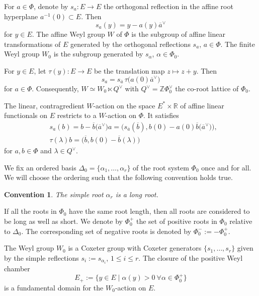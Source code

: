 \documentclass[pdftex]{sigma}
\numberwithin{equation}{section}
\newtheorem{Convention}[Theorem]{Convention}
\begin{document}
For $a\in\Phi$, denote by $s_a\colon E\rightarrow E$ the orthogonal reflection in the affine root hyperplane $a^{-1}(0)\subset E$. Then
\begin{equation*}%
s_a(y)=y-a(y)\overline{a}^\vee
\end{equation*}
for $y\in E$.
The affine Weyl group $W$ of $\Phi$ is the subgroup of affine linear transformations of $E$ generated by the orthogonal reflections $s_a$, $a\in\Phi$. The finite Weyl group $W_0$ is the subgroup generated by $s_\alpha$, $\alpha\in\Phi_0$.

For $y\in E$, let $\tau(y)\colon E\rightarrow E$ be the translation map $z\mapsto z+y$. Then
\begin{equation}\label{ssplit}
s_a=s_{\overline{a}}\,\tau\bigl(a(0)\overline{a}^\vee\bigr)
\end{equation}
for $a\in\Phi$. Consequently,
$W\simeq W_0\ltimes Q^\vee$ with $Q^\vee=\mathbb{Z}\Phi_0^\vee$ the co-root lattice of $\Phi_0$.

The linear, contragredient $W$-action
on the space $E^*\times\mathbb{R}$ of affine linear functionals on $E$ restricts to a $W$-action on $\Phi$. It satisfies
\begin{align}
&s_a(b)=b-\overline{b}\bigl(\overline{a}^\vee\bigr)a=\bigl(s_{\overline{a}}(\overline{b}),b(0)-a(0)\overline{b}\bigl(\overline{a}^\vee\bigr)\bigr),\nonumber\\
&\tau(\lambda)b=\bigl(\overline{b},b(0)-\overline{b}(\lambda)\bigr)\label{WPhiaction}
\end{align}
for $a,b\in\Phi$ and $\lambda\in Q^\vee$.

We fix an ordered basis $\Delta_0=\{\alpha_1,\dots,\alpha_r\}$ of the root system $\Phi_0$ once and for all. We will choose the ordering such that the following convention
holds true.

\begin{Convention}\label{root_length_convention}
The simple root $\alpha_r$ is a long root.
\end{Convention}

If all the roots in $\Phi_0$ have the same root length, then all roots are considered to be long as well as short.
We denote by $\Phi_0^{+}$ the set of positive roots in $\Phi_0$ relative to $\Delta_0$. The corresponding set of negative roots is denoted by $\Phi_0^-:=-\Phi_0^+$.

The Weyl group $W_0$ is a Coxeter group with Coxeter generators $\{s_1,\dots,s_r\}$ given by the simple reflections $s_i:=s_{\alpha_i}$, $1\leq i\leq r$. The closure of the positive Weyl chamber
\begin{equation*}%
E_+:=\bigl\{y\in E \mid \alpha(y)>0\ \forall \alpha\in\Phi_0^+ \bigr\}
\end{equation*}
is a fundamental domain for the $W_0$-action on $E$.
\end{document}
